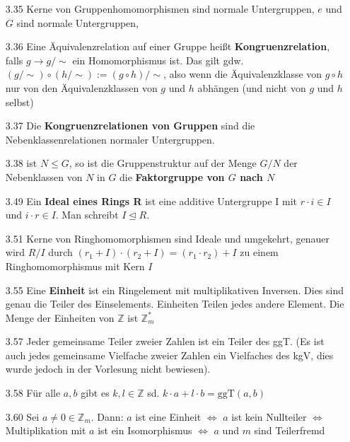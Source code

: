 \documentclass{scrartcl}
\begin{document}
\begin{itemize}
    \item [3.35] Kerne von Gruppenhomomorphismen sind normale Untergruppen, $e$ und $G$ sind normale Untergruppen, 

    \item [3.36] Eine Äquivalenzrelation auf einer Gruppe heißt \textbf{Kongruenzrelation}, falls $g \to g/\sim$ ein Homomorphismus ist. Das gilt gdw. $(g / \sim) \circ (h / \sim) := (g \circ h) / \sim$, also wenn die Äquivalenzklasse von $g \circ h$ nur von den Äquivalenzklassen von $g$ und $h$ abhängen (und nicht von $g$ und $h$ selbst)

    \item [3.37] Die \textbf{Kongruenzrelationen von Gruppen} sind die Nebenklassenrelationen normaler Untergruppen.

    \item [3.38] ist $N \leq G$, so ist die Gruppenstruktur auf der Menge $G/N$ der Nebenklassen von $N$ in $G$ die \textbf{Faktorgruppe von $G$ nach $N$}

    \item [3.49] Ein \textbf{Ideal eines Rings R} ist eine additive Untergruppe I mit $r \cdot i \in I$ und $i \cdot r \in I$. Man schreibt $I \trianglelefteq R$.

    \item [3.51] Kerne von Ringhomomorphismen sind Ideale und umgekehrt, genauer wird $R/I$ durch $(r_1 + I) \cdot (r_2 + I) = (r_1 \cdot r_2) + I$ zu einem Ringhomomorphismus mit Kern $I$

    \item [3.55] Eine \textbf{Einheit} ist ein Ringelement mit multiplikativen Inversen. Dies sind genau die Teiler des Einselements. Einheiten Teilen jedes andere Element. Die Menge der Einheiten von $\mathbb{Z}$ ist $\mathbb{Z}_m^{*}$

    \item [3.57] Jeder gemeinsame Teiler zweier Zahlen ist ein Teiler des ggT. (Es ist auch jedes gemeinsame Vielfache zweier Zahlen ein Vielfaches des kgV, dies wurde jedoch in der Vorlesung nicht bewiesen).

    \item [3.58] Für alle $a,b$ gibt es $k,l \in \mathbb{Z}$ sd. $k \cdot a + l\cdot b = \text{ggT}(a,b)$

    \item [3.60] Sei $a \neq 0 \in \mathbb{Z}_m$. Dann: $a$ ist eine Einheit $\Leftrightarrow$ $a$ ist kein Nullteiler $\Leftrightarrow$ Multiplikation mit $a$ ist ein Isomorphismus $\Leftrightarrow$ $a$ und $m$ sind Teilerfremd


\end{itemize}
\end{document}
